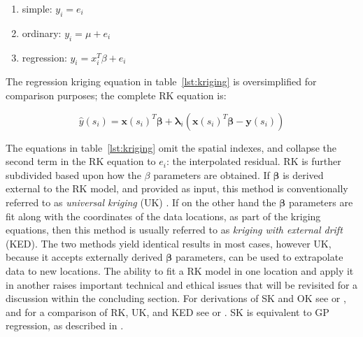 \documentclass[]{interact}
\theoremstyle{plain}%
\theoremstyle{definition}
\theoremstyle{remark}
\begin{document}
\begin{enumerate}\label{lst:kriging}
\item simple: $y_i = e_i$
\item ordinary: $y_i = \mu + e_i$
\item regression: $y_i = x_{i}^T \beta + e_i$
\end{enumerate}


The regression kriging equation in table~\ref{lst:kriging} is oversimplified for comparison purposes; the complete RK equation is:

\begin{equation} \label{eq:rk}
  \hat{y}(s_i) = \bm{x}(s_i)^T \bm{\beta} + \bm{\lambda}_i (\bm{x}(s_i)^T \bm{\beta} - \bm{y}(s_i))
\end{equation}

The equations in table~\ref{lst:kriging} omit the spatial indexes, and collapse the second term in the RK equation to $e_i$: the interpolated residual.  RK is further subdivided based upon how the $\beta$ parameters are obtained.  If $\bm{\beta}$ is derived external to the RK model, and provided as input, this method is conventionally referred to as {\em universal kriging} (UK) \citep{pebesma06, hengl07a}.  If on the other hand the $\bm{\beta}$ parameters are fit along with the coordinates of the data locations, as part of the kriging equations, then this method is usually referred to as {\em kriging with external drift} (KED).  The two methods yield identical results in most cases, however UK, because it accepts externally derived $\bm{\beta}$ parameters, can be used to extrapolate data to new locations.  The ability to fit a RK model in one location and apply it in another raises important technical and ethical issues that will be revisited for a discussion within the concluding section.  For derivations of SK and OK see \citep{wackernagel03a} or \citep{gotway97}, and for a comparison of RK, UK, and KED see \citep{hengl07a} or \citep{wackernagel03a}.  SK is equivalent to GP regression, as described in \citep{rasmussen06}.
\end{document}
